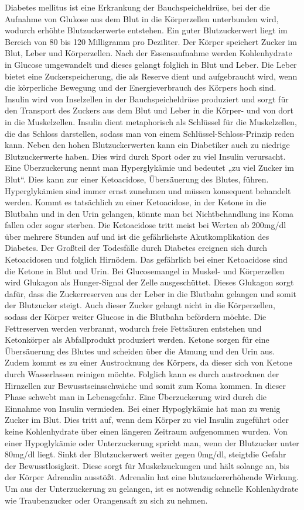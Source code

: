 \documentclass[a4paper, 12pt]{scrartcl}
\begin{document}
				Diabetes mellitus ist eine Erkrankung der Bauchspeicheldrüse, bei der die Aufnahme von Glukose aus dem Blut in die Körperzellen unterbunden wird, wodurch erhöhte Blutzuckerwerte entstehen. Ein guter Blutzuckerwert liegt im Bereich von 80 bis 120 Milligramm pro Deziliter. Der Körper speichert Zucker im Blut, Leber und Körperzellen. Nach der Essensaufnahme werden Kohlenhydrate in Glucose umgewandelt und dieses gelangt folglich in Blut und Leber. Die Leber bietet eine Zuckerspeicherung, die als Reserve dient und aufgebraucht wird, wenn die körperliche Bewegung und der Energieverbrauch des Körpers hoch sind. Insulin wird von Inselzellen in der Bauchspeicheldrüse produziert und sorgt für den Transport des Zuckers aus dem Blut und Leber in die Körper- und von dort in die Muskelzellen. Insulin dient metaphorisch als Schlüssel für die Muskelzellen, die das Schloss darstellen, sodass man von einem Schlüssel-Schloss-Prinzip reden kann. Neben den hohen Blutzuckerwerten kann ein Diabetiker auch zu niedrige Blutzuckerwerte haben. Dies wird durch Sport oder zu viel Insulin verursacht. Eine Überzuckerung nennt man Hyperglykämie und bedeutet „zu viel Zucker im Blut“. Dies kann zur einer Ketoacidose, Übersäuerung des Blutes, führen. Hyperglykämien sind immer ernst zunehmen und müssen konsequent behandelt werden. Kommt es tatsächlich zu einer Ketoacidose, in der Ketone in die Blutbahn und in den Urin gelangen, könnte man bei Nichtbehandlung ins Koma fallen oder sogar sterben. Die Ketoacidose tritt meist bei Werten ab 200mg/dl über mehrere Stunden auf und ist die gefährlichste Akutkomplikation des Diabetes. Der Großteil der Todesfälle durch Diabetes ereignen sich durch Ketoacidosen und folglich Hirnödem. Das gefährlich bei einer Ketoacidose sind die Ketone in Blut und Urin. Bei Glucosemangel in Muskel- und Körperzellen wird Glukagon als Hunger-Signal der Zelle ausgeschüttet. Dieses Glukagon sorgt dafür, dass die Zuckerreserven aus der Leber in die Blutbahn gelangen und somit der Blutzucker steigt. Auch dieser Zucker gelangt nicht in die Körperzellen, sodass der Körper weiter Glucose in die Blutbahn befördern möchte. Die Fettreserven werden verbrannt, wodurch freie Fettsäuren entstehen und Ketonkörper als Abfallprodukt produziert werden. Ketone sorgen für eine Übersäuerung des Blutes und scheiden über die Atmung und den Urin aus. Zudem kommt es zu einer Austrocknung des Körpers, da dieser sich von Ketone durch Wasserlassen reinigen möchte. Folglich kann es durch austrocknen der Hirnzellen zur Bewusstseinsschwäche und somit zum Koma kommen. In dieser Phase schwebt man in Lebensgefahr. Eine Überzuckerung wird durch die Einnahme von Insulin vermieden. Bei einer Hypoglykämie hat man zu wenig Zucker im Blut. Dies tritt auf, wenn dem Körper zu viel Insulin zugeführt oder keine Kohlenhydrate über einen längeren Zeitraum aufgenommen wurden. Von einer Hypoglykämie oder Unterzuckerung spricht man, wenn der Blutzucker unter 80mg/dl liegt. Sinkt der Blutzuckerwert weiter gegen 0mg/dl, steigtdie Gefahr der Bewusstlosigkeit. Diese sorgt für Muskelzuckungen und hält solange an, bis der Körper Adrenalin ausstößt. Adrenalin hat eine blutzuckererhöhende Wirkung. Um aus der Unterzuckerung zu gelangen, ist es notwendig schnelle Kohlenhydrate wie Traubenzucker oder Orangensaft zu sich zu nehmen.
\end{document}
